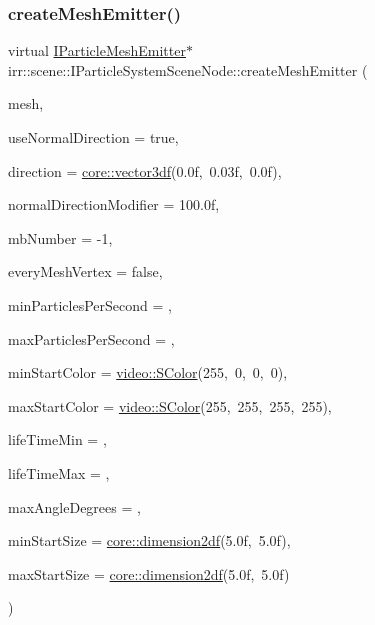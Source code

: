 \subsubsection{\texorpdfstring{create\+Mesh\+Emitter()}{createMeshEmitter()}}
{\footnotesize\ttfamily virtual \hyperlink{classirr_1_1scene_1_1IParticleMeshEmitter}{I\+Particle\+Mesh\+Emitter}$\ast$ irr\+::scene\+::\+I\+Particle\+System\+Scene\+Node\+::create\+Mesh\+Emitter (\begin{DoxyParamCaption}\item[{\hyperlink{classirr_1_1scene_1_1IMesh}{scene\+::\+I\+Mesh} $\ast$}]{mesh,  }\item[{bool}]{use\+Normal\+Direction = {\ttfamily true},  }\item[{const \hyperlink{namespaceirr_1_1core_a06f169d08b5c429f5575acb7edbad811}{core\+::vector3df} \&}]{direction = {\ttfamily \hyperlink{namespaceirr_1_1core_a06f169d08b5c429f5575acb7edbad811}{core\+::vector3df}(0.0f,~0.03f,~0.0f)},  }\item[{\hyperlink{namespaceirr_a0277be98d67dc26ff93b1a6a1d086b07}{f32}}]{normal\+Direction\+Modifier = {\ttfamily 100.0f},  }\item[{\hyperlink{namespaceirr_ac66849b7a6ed16e30ebede579f9b47c6}{s32}}]{mb\+Number = {\ttfamily -\/1},  }\item[{bool}]{every\+Mesh\+Vertex = {\ttfamily false},  }\item[{\hyperlink{namespaceirr_a0416a53257075833e7002efd0a18e804}{u32}}]{min\+Particles\+Per\+Second = {},  }\item[{\hyperlink{namespaceirr_a0416a53257075833e7002efd0a18e804}{u32}}]{max\+Particles\+Per\+Second = {},  }\item[{const \hyperlink{classirr_1_1video_1_1SColor}{video\+::\+S\+Color} \&}]{min\+Start\+Color = {\ttfamily \hyperlink{classirr_1_1video_1_1SColor}{video\+::\+S\+Color}(255,~0,~0,~0)},  }\item[{const \hyperlink{classirr_1_1video_1_1SColor}{video\+::\+S\+Color} \&}]{max\+Start\+Color = {\ttfamily \hyperlink{classirr_1_1video_1_1SColor}{video\+::\+S\+Color}(255,~255,~255,~255)},  }\item[{\hyperlink{namespaceirr_a0416a53257075833e7002efd0a18e804}{u32}}]{life\+Time\+Min = {},  }\item[{\hyperlink{namespaceirr_a0416a53257075833e7002efd0a18e804}{u32}}]{life\+Time\+Max = {},  }\item[{\hyperlink{namespaceirr_ac66849b7a6ed16e30ebede579f9b47c6}{s32}}]{max\+Angle\+Degrees = {},  }\item[{const \hyperlink{namespaceirr_1_1core_af6dc5c45ff13e7712758c827ff58676b}{core\+::dimension2df} \&}]{min\+Start\+Size = {\ttfamily \hyperlink{namespaceirr_1_1core_af6dc5c45ff13e7712758c827ff58676b}{core\+::dimension2df}(5.0f,~5.0f)},  }\item[{const \hyperlink{namespaceirr_1_1core_af6dc5c45ff13e7712758c827ff58676b}{core\+::dimension2df} \&}]{max\+Start\+Size = {\ttfamily \hyperlink{namespaceirr_1_1core_af6dc5c45ff13e7712758c827ff58676b}{core\+::dimension2df}(5.0f,~5.0f)} }\end{DoxyParamCaption})\hspace{0.3cm}{\ttfamily [pure virtual]}}
